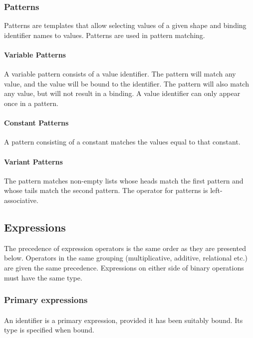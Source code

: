 \subsubsection{Patterns} 
Patterns are templates that allow selecting values of a given shape and binding identifier names to values. Patterns are used in pattern matching. 

\paragraph{Variable Patterns}
A variable pattern consists of a value identifier. The pattern will match any value, and the value will be bound to the identifier. The pattern \term{\_} will also match any value, but will not result in a binding. A value identifier can only appear once in a pattern.

\paragraph{Constant Patterns}
A pattern consisting of a constant matches the values equal to that constant.

\paragraph{Variant Patterns}
The pattern  \term{::}  matches non-empty lists whose heads match the first pattern and whose tails match the second pattern. The \term{::} operator for patterns is left-associative.

\subsection{Expressions}

The precedence of expression operators is the same order as they are presented below. Operators in the same grouping (multiplicative, additive, relational etc.) are given the same precedence. Expressions on either side of binary operations must have the same type. 

\subsubsection{Primary expressions}

\paragraph{}
An identifier is a primary expression, provided it has been suitably bound. Its type is specified when bound. 


